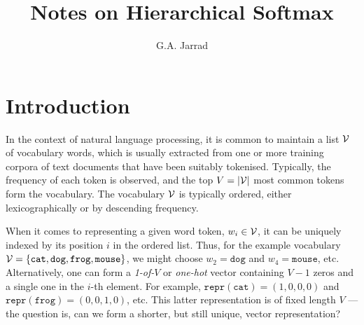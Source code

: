 \documentclass[a4paper]{article}
\title{Notes on Hierarchical Softmax}
\author{G.A. Jarrad}
\begin{document}
\maketitle
{}

\section{Introduction}

In the context of natural language processing, it is common to maintain a list ${\cal V}$ of vocabulary words, which is usually
extracted from one or more training corpora of text documents that have been suitably tokenised.
Typically, the frequency of each token is observed, and the top $V=|{\cal V}|$ most common tokens form the vocabulary.
The vocabulary ${\cal V}$ is typically ordered, either lexicographically or by descending frequency.

When it comes to representing a given word token, $w_i\in{\cal V}$, 
it can be uniquely indexed by its position $i$ in the ordered list.
Thus, for the example vocabulary ${\cal V} = \{{\tt cat},{\tt dog},{\tt frog},{\tt mouse}\}$,
we might choose $w_2=\texttt{dog}$ and $w_4=\texttt{mouse}$, etc.
Alternatively, one can form a {\em 1-of-$V$} or {\em one-hot} vector containing $V-1$ zeros and a single one in the $i$-th
element. 
For example, $\texttt{repr}(\texttt{cat})=(1,0,0,0)$ and $\texttt{repr}(\texttt{frog})=(0,0,1,0)$, etc.
This latter representation is of fixed length $V$ --- 
the question is, can we form a shorter, but still unique, vector representation?
\end{document}
